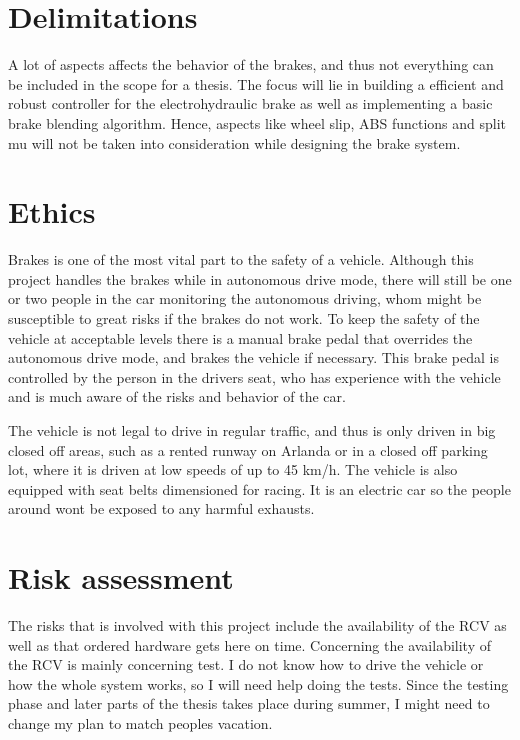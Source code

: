 \documentclass[a4paper,11pt]{kth-mag}
\begin{document}
\section{Delimitations}
A lot of aspects affects the behavior of the brakes, and thus not everything can be included in the scope for a thesis. The focus will lie in building a efficient and robust controller for the electrohydraulic brake as well as implementing a basic brake blending algorithm. Hence, aspects like wheel slip, ABS functions and split mu will not be taken into consideration while designing the brake system. 

\section{Ethics}
Brakes is one of the most vital part to the safety of a vehicle. Although this project handles the brakes while in autonomous drive mode, there will still be one or two people in the car monitoring the autonomous driving, whom might be susceptible to great risks if the brakes do not work. To keep the safety of the vehicle at acceptable levels there is a manual brake pedal that overrides the autonomous drive mode, and brakes the vehicle if necessary. This brake pedal is controlled by the person in the drivers seat, who has experience with the vehicle and is much aware of the risks and behavior of the car. 

The vehicle is not legal to drive in regular traffic, and thus is only driven in big closed off areas, such as a rented runway on Arlanda or in a closed off parking lot, where it is driven at low speeds of up to 45 km/h. The vehicle is also equipped with seat belts dimensioned for racing. 
It is an electric car so the people around wont be exposed to any harmful exhausts. 


\section{Risk assessment}
The risks that is involved with this project include the availability of the RCV as well as that ordered hardware gets here on time. Concerning the availability of the RCV is mainly concerning test. I do not know how to drive the vehicle or how the whole system works, so I will need help doing the tests. Since the testing phase and later parts of the thesis takes place during summer, I might need to change my plan to match peoples vacation. \newline
\end{document}
